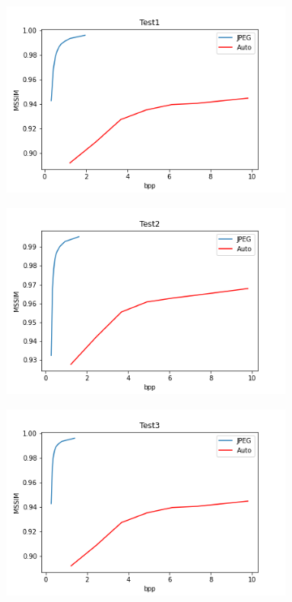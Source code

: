 \documentclass{article}
\begin{document}
\begin{figure}
    \centering
    \begin{subfigure}[b]{0.7 \textwidth}
    \includegraphics[width=\textwidth]{Images/Plots/test1_MSSIM.png}
    \end{subfigure}
    \begin{subfigure}[b]{0.7 \textwidth}
    \includegraphics[width=\textwidth]{Images/Plots/test2_MSSIM.png}
    \end{subfigure}
    \begin{subfigure}[b]{0.7 \textwidth}
    \includegraphics[width=\textwidth]{Images/Plots/test3_MSSIM.png}

\end{subfigure}
\end{figure}
\end{document}
